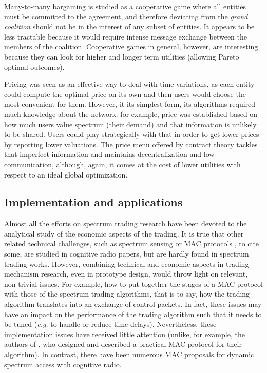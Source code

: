 Many-to-many bargaining is studied as a cooperative game where all entities must be committed to the agreement, and therefore deviating from the \textit{grand coalition} should not be in the interest of any subset of entities. 
It appears to be less tractable because it would require intense message exchange between the members of the coalition.
Cooperative games in general, however, are interesting because they can look for higher and longer term utilities (allowing Pareto optimal outcomes). 
	
Pricing was seen as an effective way to deal with time variations, as each entity could compute the optimal price on its own and then users would choose the most convenient for them. 
However, it its simplest form, its algorithms required much knowledge about the network: for example, price was established based on how much users value spectrum (their demand) and that information is unlikely to be shared. 
Users could play strategically with that in order to get lower prices by reporting lower valuations. The price menu offered by contract theory tackles that imperfect information and maintains decentralization and low communication, although, again, it comes at the cost of lower utilities with respect to an ideal global optimization. 

\subsection{Implementation and applications}
Almost all the efforts on spectrum trading research have been devoted to the analytical study of the economic aspects of the trading. 
It is true that other related technical challenges, such as spectrum sensing or MAC protocols \cite{ref:BWang2011,ref:MAC}, to cite some, are studied in cognitive radio papers, but are hardly found in spectrum trading works. 
However, combining technical and economic aspects in trading mechanism research, even in prototype design, would throw light on relevant, non-trivial issues.
For example, how to put together the stages of a MAC protocol with those of the spectrum trading algorithms, that is to say, how the trading algorithm translates into an exchange of control packets. 
In fact, these issues may have an impact on the performance of the trading algorithm such that it needs to be tuned (\textit{e.g.} to handle or reduce time delays). 
Nevertheless, these implementation issues have received little attention (unlike, for example, the authors of \cite{ref:Wang2008}, who designed and described a practical MAC protocol for their algorithm). 
In contrast, there have been numerous MAC proposals \cite{ref:MAC} for dynamic spectrum access with cognitive radio. 

